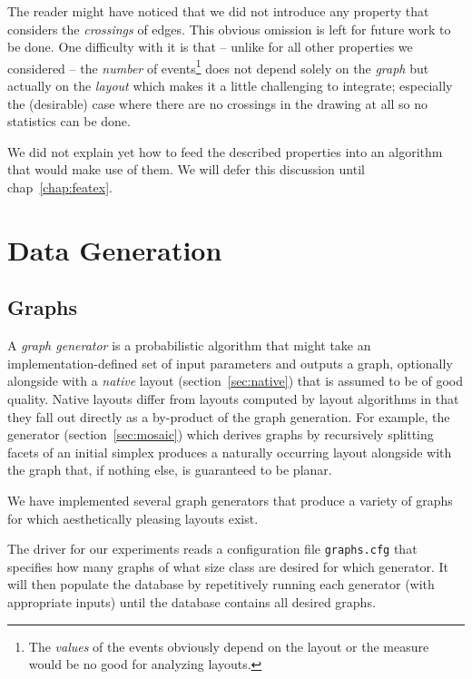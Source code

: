 \documentclass{graphstudy}
\begin{document}
The reader might have noticed that we did not introduce any property that considers the \emph{crossings} of edges.  This
obvious omission is left for future work to be done.  One difficulty with it is that -- unlike for all other properties
we considered -- the \emph{number} of events\footnote{%
  The \emph{values} of the events obviously depend on the layout or the measure would be no good for analyzing layouts.
}
does not depend solely on the \emph{graph} but actually on the \emph{layout} which makes it a little challenging to
integrate; especially the (desirable) case where there are no crossings in the drawing at all so no statistics can be
done.

We did not explain yet how to feed the described properties into an algorithm that would make use of them.  We will
defer this discussion until \acl{chap}~\ref{chap:featex}.

\chapter{Data Generation}
\label{chap:datgen}

\section{Graphs}
\label{sec:graphs}


A \emph{graph generator} is a probabilistic algorithm that might take an implementation-defined set of input parameters
and outputs a graph, optionally alongside with a \emph{native} layout (\acs{section}~\ref{sec:native}) that is assumed
to be of good quality.  Native layouts differ from layouts computed by layout algorithms in that they fall out directly
as a by-product of the graph generation.  For example, the  generator (\acs{section}~\ref{sec:mosaic})
which derives graphs by recursively splitting facets of an initial simplex produces a naturally occurring layout
alongside with the graph that, if nothing else, is guaranteed to be planar.

We have implemented several graph generators that produce a variety of graphs for which aesthetically pleasing layouts
exist.

The driver for our experiments reads a configuration file \verb`graphs.cfg` that specifies how many graphs of what size
class are desired for which generator.  It will then populate the database by repetitively running each generator (with
appropriate inputs) until the database contains all desired graphs.
\end{document}
